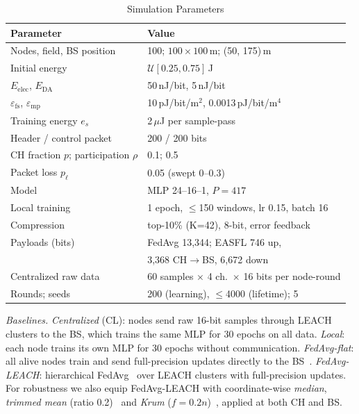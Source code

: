 \documentclass[journal]{IEEEtran}
\begin{document}
\begin{table}[t]
\caption{Simulation Parameters}\label{tab:params}
\centering\scriptsize
\begin{tabular}{@{}ll@{}}
\toprule
Parameter & Value\\
\midrule
Nodes, field, BS position & 100; $100\times100$\,m; (50, 175)\,m\\
Initial energy & $\mathcal{U}[0.25,0.75]$\,J\\
$E_{\mathrm{elec}}$, $E_{\mathrm{DA}}$ & 50\,nJ/bit, 5\,nJ/bit\\
$\varepsilon_{\mathrm{fs}}$, $\varepsilon_{\mathrm{mp}}$ & 10\,pJ/bit/m$^2$, 0.0013\,pJ/bit/m$^4$\\
Training energy $e_s$ & 2\,$\mu$J per sample-pass\\
Header / control packet & 200 / 200 bits\\
CH fraction $p$; participation $\rho$ & 0.1; 0.5\\
Packet loss $p_\ell$ & 0.05 (swept 0--0.3)\\
Model & MLP 24--16--1, $P=417$\\
Local training & 1 epoch, $\le$150 windows, lr 0.15, batch 16\\
Compression & top-10\% (K=42), 8-bit, error feedback\\
Payloads (bits) & FedAvg 13,344; EASFL 746 up,\\
 & 3,368 CH$\to$BS, 6,672 down\\
Centralized raw data & 60 samples $\times$ 4 ch.\ $\times$ 16 bits per node-round\\
Rounds; seeds & 200 (learning), $\le$4000 (lifetime); 5\\
\bottomrule
\end{tabular}
\end{table}

\textit{Baselines.} \emph{Centralized} (CL): nodes send raw 16-bit samples through LEACH clusters to the BS, which trains the same MLP for 30 epochs on all data. \emph{Local}: each node trains its own MLP for 30 epochs without communication. \emph{FedAvg-flat}: all alive nodes train and send full-precision updates directly to the BS~\cite{mcmahan2017}. \emph{FedAvg-LEACH}: hierarchical FedAvg~\cite{liu2020hfl} over LEACH clusters with full-precision updates. For robustness we also equip FedAvg-LEACH with coordinate-wise \emph{median}, \emph{trimmed mean} (ratio 0.2)~\cite{yin2018} and \emph{Krum} ($f=0.2n$)~\cite{blanchard2017}, applied at both CH and BS.
\end{document}
